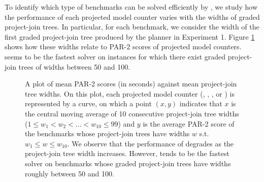 To identify which type of benchmarks can be solved efficiently by \procount{}, we study how the performance of each projected model counter varies with the widths of graded project-join trees.
In particular, for each benchmark, we consider the width of the first graded project-join tree produced by the planner \Lg{} in Experiment 1.
Figure \ref{time_vs_width} shows how these widths relate to PAR-2 scores of projected model counters. 
\procount{} seems to be the fastest solver on instances for which there exist graded project-join trees of widths between 50 and 100.
\begin{figure}[t]
    \centering
    
    \vspace*{-0.9cm}
    \caption{
        A plot of mean PAR-2 scores (in seconds) against mean project-join tree widths.
        On this plot, each projected model counter (\procount{}, \dfp{}, \projmc, or \ssat) is represented by a curve, on which a point $(x, y)$ indicates that $x$ is the central moving average of 10 consecutive project-join tree widths ($1 \le w_1 < w_2 < \ldots < w_{10} \le 99$) and $y$ is the average PAR-2 score of the benchmarks whose project-join trees have widths $w$ s.t. $w_1 \le w \le w_{10}$.
        We observe that the performance of \procount{} degrades as the project-join tree width increases.
        However, \procount{} tends to be the fastest solver on benchmarks whose graded project-join trees have widths roughly between 50 and 100.
    }
    \label{time_vs_width}
\end{figure}
